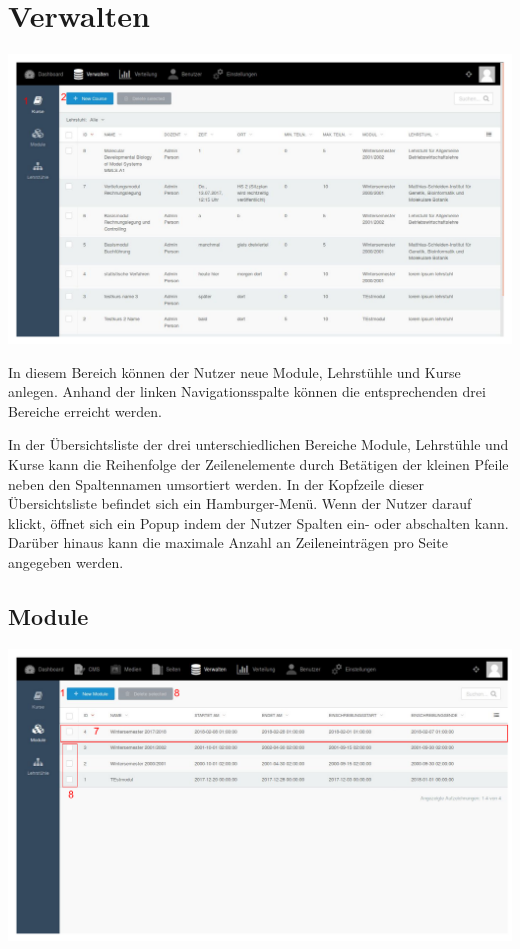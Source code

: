  
  \section{Verwalten}
  \label{section:manage}
  
    \includegraphics[scale=0.3]{backend/img/verwalten_kurse.pdf}

    In diesem Bereich können der Nutzer neue Module, Lehrstühle und Kurse anlegen.
    Anhand der linken Navigationsspalte können die entsprechenden drei Bereiche erreicht werden.

    In der Übersichtsliste der drei unterschiedlichen Bereiche Module, Lehrstühle und Kurse kann die Reihenfolge der Zeilenelemente durch Betätigen
    der kleinen Pfeile neben den Spaltennamen umsortiert werden.
    In der Kopfzeile dieser Übersichtsliste befindet sich ein Hamburger-Menü. 
    Wenn der Nutzer darauf klickt, öffnet sich ein Popup indem der Nutzer Spalten ein- oder abschalten kann.
    Darüber hinaus kann die maximale Anzahl an Zeileneinträgen pro Seite angegeben werden.
    
    \subsection{Module}
    
    \includegraphics[scale=0.3]{backend/img/module_1.pdf}

